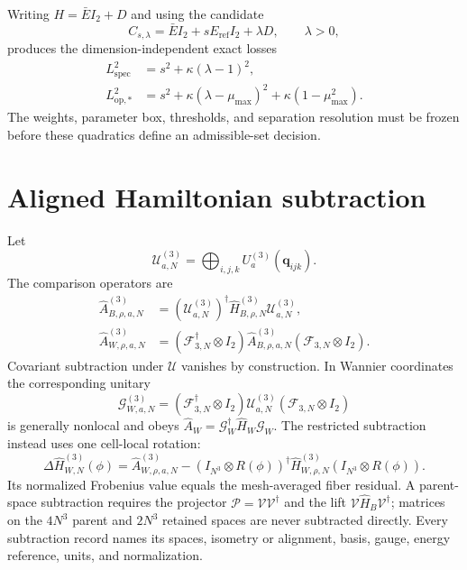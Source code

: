 \documentclass[11pt]{article}
\begin{document}
Writing $H=\bar E I_2+D$ and using the candidate
\begin{equation}
 C_{s,\lambda}=\bar E I_2+sE_{\mathrm{ref}}I_2+\lambda D,
 \qquad \lambda>0,
\end{equation}
produces the dimension-independent exact losses
\begin{align}
 L_{\mathrm{spec}}^2&=s^2+\kappa(\lambda-1)^2,\\
 L_{\mathrm{op},*}^2&=s^2+\kappa(\lambda-\mu_{\max})^2
                     +\kappa(1-\mu_{\max}^2).
 \label{eq:losses}
\end{align}
The weights, parameter box, thresholds, and separation resolution must be frozen before
these quadratics define an admissible-set decision.

\section{Aligned Hamiltonian subtraction}

Let
\begin{equation}
 \mathcal U_{a,N}^{(3)}=\bigoplus_{i,j,k}U_a^{(3)}(\mathbf q_{ijk}).
\end{equation}
The comparison operators are
\begin{align}
 \widehat A_{B,\rho,a,N}^{(3)}
 &=(\mathcal U_{a,N}^{(3)})^\dagger
   \widehat H_{B,\rho,N}^{(3)}\mathcal U_{a,N}^{(3)},\\
 \widehat A_{W,\rho,a,N}^{(3)}
 &=(\mathcal F_{3,N}^\dagger\otimes I_2)
   \widehat A_{B,\rho,a,N}^{(3)}
   (\mathcal F_{3,N}\otimes I_2).
\end{align}
Covariant subtraction under $\mathcal U$ vanishes by construction. In Wannier
coordinates the corresponding unitary
\begin{equation}
 \mathcal G_{W,a,N}^{(3)}
 =(\mathcal F_{3,N}^\dagger\otimes I_2)
  \mathcal U_{a,N}^{(3)}
 (\mathcal F_{3,N}\otimes I_2)
\end{equation}
is generally nonlocal and obeys
$\widehat A_W=\mathcal G_W^\dagger\widehat H_W\mathcal G_W$.
The restricted subtraction instead uses one cell-local rotation:
\begin{equation}
 \Delta\widehat H_{W,N}^{(3)}(\phi)
 =\widehat A_{W,\rho,a,N}^{(3)}
 -(I_{N^3}\otimes R(\phi))^\dagger
  \widehat H_{W,\rho,N}^{(3)}
  (I_{N^3}\otimes R(\phi)).
 \label{eq:restricted-subtraction}
\end{equation}
Its normalized Frobenius value equals the mesh-averaged fiber residual. A parent-space
subtraction requires the projector $\mathcal P=\mathcal V\mathcal V^\dagger$ and the
lift $\mathcal V\widehat H_B\mathcal V^\dagger$; matrices on the $4N^3$ parent and
$2N^3$ retained spaces are never subtracted directly. Every subtraction record names
its spaces, isometry or alignment, basis, gauge, energy reference, units, and
normalization.
\end{document}
